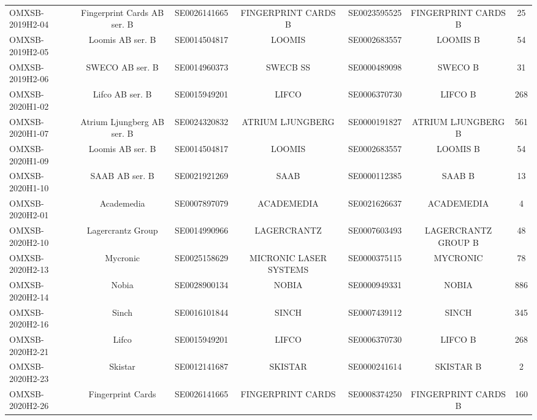 \begin{threeparttable}
\begin{tabular}{@{}lcccccc}
\addlinespace[0.25ex]
\addlinespace[0.25ex]
OMXSB-2019H2-04 & Fingerprint Cards AB ser. B & SE0026141665 & FINGERPRINT CARDS B & SE0023595525 & FINGERPRINT CARDS B & 25 \\
\addlinespace[0.25ex]
\addlinespace[0.25ex]
OMXSB-2019H2-05 & Loomis AB ser. B & SE0014504817 & LOOMIS & SE0002683557 & LOOMIS B & 54 \\
\addlinespace[0.25ex]
\addlinespace[0.25ex]
OMXSB-2019H2-06 & SWECO AB ser. B & SE0014960373 & SWECB SS & SE0000489098 & SWECO B & 31 \\
\addlinespace[0.25ex]
\addlinespace[0.25ex]
OMXSB-2020H1-02 & Lifco AB ser. B & SE0015949201 & LIFCO & SE0006370730 & LIFCO B & 268 \\
\addlinespace[0.25ex]
\addlinespace[0.25ex]
OMXSB-2020H1-07 & Atrium Ljungberg AB ser. B & SE0024320832 & ATRIUM LJUNGBERG & SE0000191827 & ATRIUM LJUNGBERG B & 561 \\
\addlinespace[0.25ex]
\addlinespace[0.25ex]
OMXSB-2020H1-09 & Loomis AB ser. B & SE0014504817 & LOOMIS & SE0002683557 & LOOMIS B & 54 \\
\addlinespace[0.25ex]
\addlinespace[0.25ex]
OMXSB-2020H1-10 & SAAB AB ser. B & SE0021921269 & SAAB & SE0000112385 & SAAB B & 13 \\
\addlinespace[0.25ex]
\addlinespace[0.25ex]
OMXSB-2020H2-01 & Academedia & SE0007897079 & ACADEMEDIA & SE0021626637 & ACADEMEDIA & 4 \\
\addlinespace[0.25ex]
\addlinespace[0.25ex]
OMXSB-2020H2-10 & Lagercrantz Group & SE0014990966 & LAGERCRANTZ & SE0007603493 & LAGERCRANTZ GROUP B & 48 \\
\addlinespace[0.25ex]
\addlinespace[0.25ex]
OMXSB-2020H2-13 & Mycronic & SE0025158629 & MICRONIC LASER SYSTEMS & SE0000375115 & MYCRONIC & 78 \\
\addlinespace[0.25ex]
\addlinespace[0.25ex]
OMXSB-2020H2-14 & Nobia & SE0028900134 & NOBIA & SE0000949331 & NOBIA & 886 \\
\addlinespace[0.25ex]
\addlinespace[0.25ex]
OMXSB-2020H2-16 & Sinch & SE0016101844 & SINCH & SE0007439112 & SINCH & 345 \\
\addlinespace[0.25ex]
\addlinespace[0.25ex]
OMXSB-2020H2-21 & Lifco & SE0015949201 & LIFCO & SE0006370730 & LIFCO B & 268 \\
\addlinespace[0.25ex]
\addlinespace[0.25ex]
OMXSB-2020H2-23 & Skistar & SE0012141687 & SKISTAR & SE0000241614 & SKISTAR B & 2 \\
\addlinespace[0.25ex]
\addlinespace[0.25ex]
OMXSB-2020H2-26 & Fingerprint Cards & SE0026141665 & FINGERPRINT CARDS & SE0008374250 & FINGERPRINT CARDS B & 160 \\

\end{tabular}
\end{threeparttable}
